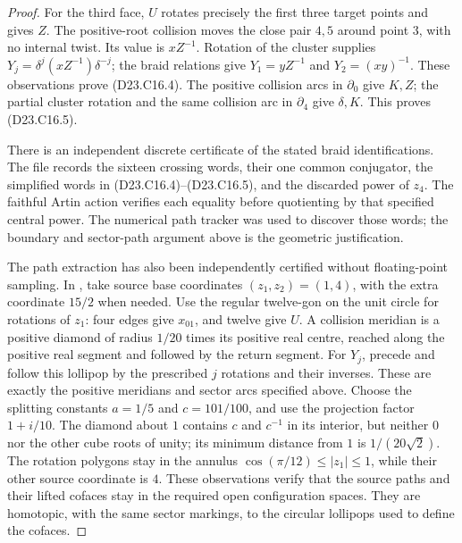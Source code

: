 \begin{proof}
For the third face, $U$ rotates precisely the first three target
points and gives $Z$. The positive-root collision moves the close
pair $4,5$ around point $3$, with no internal twist. Its value is
$xZ^{-1}$. Rotation of the cluster supplies
$Y_j=\delta^j(xZ^{-1})\delta^{-j}$; the braid relations give
$Y_1=yZ^{-1}$ and $Y_2=(xy)^{-1}$. These observations prove
(D23.C16.4). The positive collision arcs in $\partial_0$ give
$K,Z$; the partial cluster rotation and the same collision arc
in $\partial_4$ give $\delta,K$. This proves (D23.C16.5).

There is an independent discrete certificate of the stated braid
identifications. The file
records the sixteen crossing words, their one common conjugator,
the simplified words in (D23.C16.4)--(D23.C16.5), and the discarded
power of $z_4$. The faithful Artin action verifies each equality
before quotienting by that specified central power. The numerical
path tracker was used to discover those words; the boundary and
sector-path argument above is the geometric justification.

The path extraction has also been independently certified without
floating-point sampling. In
, take source base coordinates
$(z_1,z_2)=(1,4)$, with the extra coordinate $15/2$ when needed.
Use the regular twelve-gon on the unit circle for rotations of
$z_1$: four edges give $x_{01}$, and twelve give $U$.
A collision meridian is a positive diamond of radius $1/20$
times its positive real centre, reached along the positive real
segment and followed by the return segment. For $Y_j$, precede
and follow this lollipop by the prescribed $j$ rotations and
their inverses. These are exactly the positive meridians and
sector arcs specified above. Choose the splitting constants
$a=1/5$ and $c=101/100$, and use the projection factor $1+i/10$.
The diamond about $1$ contains $c$ and $c^{-1}$ in its interior,
but neither $0$ nor the other cube roots of unity; its minimum
distance from $1$ is $1/(20\sqrt2)$. The rotation polygons stay
in the annulus $\cos(\pi/12)\leq|z_1|\leq1$, while their other
source coordinate is $4$. These observations verify that the
source paths and their lifted cofaces stay in the required open
configuration spaces. They are homotopic, with the same sector
markings, to the circular lollipops used to define the cofaces.


\end{proof}
